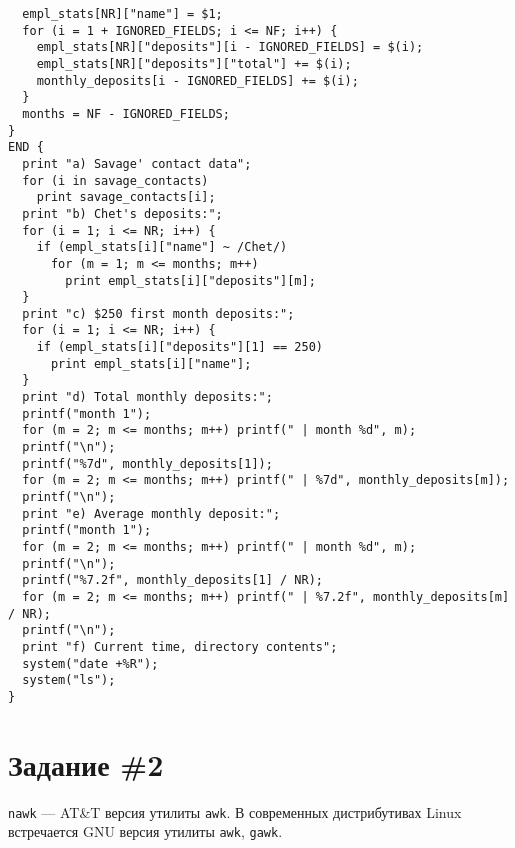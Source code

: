 \documentclass[listings]{labreport}
\begin{document}
\begin{enumerate}
\begin{verbatim}
  empl_stats[NR]["name"] = $1;
  for (i = 1 + IGNORED_FIELDS; i <= NF; i++) {
    empl_stats[NR]["deposits"][i - IGNORED_FIELDS] = $(i);
    empl_stats[NR]["deposits"]["total"] += $(i);
    monthly_deposits[i - IGNORED_FIELDS] += $(i);
  }
  months = NF - IGNORED_FIELDS;
}
END {
  print "a) Savage' contact data";
  for (i in savage_contacts)
    print savage_contacts[i];
  print "b) Chet's deposits:";
  for (i = 1; i <= NR; i++) {
    if (empl_stats[i]["name"] ~ /Chet/)
      for (m = 1; m <= months; m++)
        print empl_stats[i]["deposits"][m];
  }
  print "c) $250 first month deposits:";
  for (i = 1; i <= NR; i++) {
    if (empl_stats[i]["deposits"][1] == 250)
      print empl_stats[i]["name"];
  }
  print "d) Total monthly deposits:";
  printf("month 1");
  for (m = 2; m <= months; m++) printf(" | month %d", m);
  printf("\n");
  printf("%7d", monthly_deposits[1]);
  for (m = 2; m <= months; m++) printf(" | %7d", monthly_deposits[m]);
  printf("\n");
  print "e) Average monthly deposit:";
  printf("month 1");
  for (m = 2; m <= months; m++) printf(" | month %d", m);
  printf("\n");
  printf("%7.2f", monthly_deposits[1] / NR);
  for (m = 2; m <= months; m++) printf(" | %7.2f", monthly_deposits[m] / NR);
  printf("\n");
  print "f) Current time, directory contents";
  system("date +%R");
  system("ls");
}
\end{verbatim}

\end{enumerate}

\section*{Задание \#2}

\verb|nawk| — AT\&T версия утилиты \verb|awk|. В современных дистрибутивах Linux
встречается GNU версия утилиты \verb|awk|, \verb|gawk|.
\end{document}
